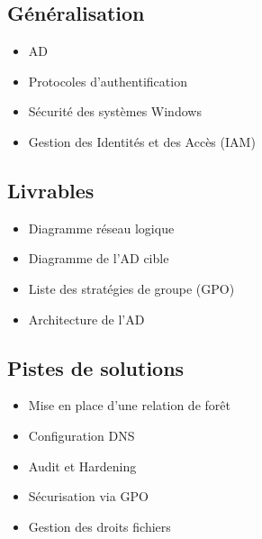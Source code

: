 \subsection*{Généralisation}
{}
\begin{itemize}
	\item AD
	\item Protocoles d'authentification
	\item Sécurité des systèmes Windows
	\item Gestion des Identités et des Accès (IAM)
\end{itemize}

\subsection*{Livrables}
{}
\begin{itemize}
	\item Diagramme réseau logique
	\item Diagramme de l'AD cible
	\item Liste des stratégies de groupe (GPO)
	\item Architecture de l'AD
\end{itemize}

\subsection*{Pistes de solutions}
{}
\begin{itemize}
	\item Mise en place d'une relation de forêt
	\item Configuration DNS
	\item Audit et Hardening
	\item Sécurisation via GPO
	\item Gestion des droits fichiers

\end{itemize}

\newpage

